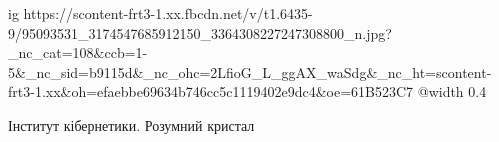 
 
 
 
 

\ifcmt
  ig https://scontent-frt3-1.xx.fbcdn.net/v/t1.6435-9/95093531_3174547685912150_3364308227247308800_n.jpg?_nc_cat=108&ccb=1-5&_nc_sid=b9115d&_nc_ohc=2LfioG_L_ggAX_waSdg&_nc_ht=scontent-frt3-1.xx&oh=efaebbe69634b746cc5c1119402e9dc4&oe=61B523C7
  @width 0.4
\fi


Інститут кібернетики. Розумний кристал
